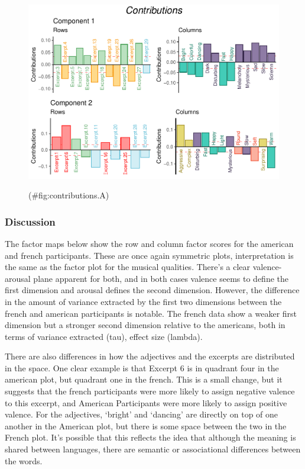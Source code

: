 \documentclass[
  english,
  man,floatsintext]{apa6}
\begin{document}
\begin{figure}

{\centering \includegraphics{Music-Descriptor-Space_files/figure-latex/contributions.A-1} 

}

\caption{ }(\#fig:contributions.A)
\end{figure}

\hypertarget{discussion-1}{%
\subsubsection{Discussion}\label{discussion-1}}

The factor maps below show the row and column factor scores for the american and french participants. These are once again symmetric plots, interpretation is the same as the factor plot for the musical qualities. There's a clear valence-arousal plane apparent for both, and in both cases valence seems to define the first dimension and arousal defines the second dimension. However, the difference in the amount of variance extracted by the first two dimensions between the french and american participants is notable. The french data show a weaker first dimension but a stronger second dimension relative to the americans, both in terms of variance extracted (tau), effect size (lambda).

There are also differences in how the adjectives and the excerpts are distributed in the space. One clear example is that Excerpt 6 is in quadrant four in the american plot, but quadrant one in the french. This is a small change, but it suggests that the french participants were more likely to assign negative valence to this excerpt, and American Participants were more likely to assign positive valence. For the adjectives, `bright' and `dancing' are directly on top of one another in the American plot, but there is some space between the two in the French plot. It's possible that this reflects the idea that although the meaning is shared between languages, there are semantic or associational differences between the words.
\end{document}
